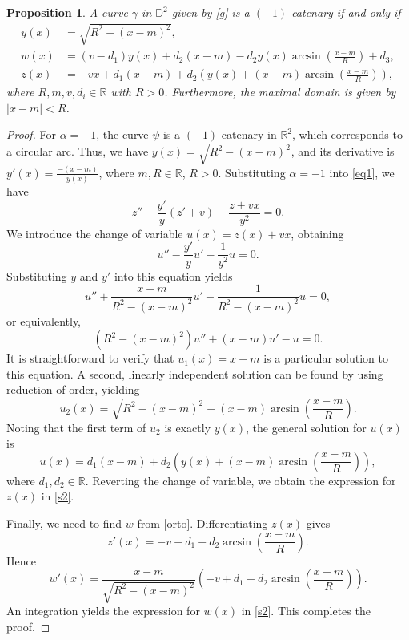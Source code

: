 \documentclass[a4paper,12pt]{amsart}
\newtheorem{proposition}[theorem]{Proposition}
\theoremstyle{definition}
\def\r{\mathbb R}
\def\d{\mathsf d}
\def\d{\mathbb D}
\begin{document}
 
 
\begin{proposition}\label{p25}
A curve $\gamma $ in $\d^2$     given by \eqref{g} is a $(-1)$-catenary if and only if 
\begin{equation}
\begin{split}\label{s2}
y(x)&=\sqrt{R^2-(x-m)^2},\\
w(x)&=(v-d_1) y(x) + d_2 (x-m) - d_2 y(x) \arcsin\left(\frac{x-m}{R}\right) + d_3,\\
z(x)&=-vx + d_1(x-m) + d_2 \left( y(x) + (x-m)\arcsin\left(\frac{x-m}{R}\right) \right),
\end{split}
\end{equation}
where $R, m, v, d_i \in \mathbb{R}$ with $R>0$. Furthermore, the maximal domain is given by $|x-m| < R$.
\end{proposition}

\begin{proof}
For $\alpha=-1$, the   curve $\psi$ is a $(-1)$-catenary in $\r^2$, which corresponds to a circular arc. Thus, we have $y(x) = \sqrt{R^2-(x-m)^2}$, and its derivative is $y'(x) = \frac{-(x-m)}{y(x)}$, where $m,R\in \r$, $R>0$. Substituting $\alpha=-1$ into \eqref{eq1}, we have
$$
z'' - \frac{y'}{y}(z'+v) - \frac{z+vx}{y^2} = 0.
$$
We introduce the change of variable $u(x)=z(x)+vx$, obtaining
$$
u'' - \frac{y'}{y} u' - \frac{1}{y^2} u = 0.
$$
Substituting $y$ and $y'$ into this equation yields
$$
u'' + \frac{x-m}{R^2-(x-m)^2} u' - \frac{1}{R^2-(x-m)^2} u = 0,
$$
or equivalently,
$$
(R^2-(x-m)^2) u'' + (x-m) u' - u = 0.
$$
It is straightforward to verify that $u_1(x) = x-m$ is a particular solution to this equation. A second, linearly independent solution can be found by using reduction of order, yielding 
$$u_2(x) = \sqrt{R^2-(x-m)^2} + (x-m)\arcsin\left(\frac{x-m}{R}\right).$$
 Noting that the first term of $u_2$ is exactly $y(x)$, the general solution for $u(x)$ is
$$
u(x) = d_1 (x-m) + d_2 \left( y(x) + (x-m)\arcsin\left(\frac{x-m}{R}\right) \right),
$$
where $d_1, d_2 \in \mathbb{R}$. Reverting the change of variable, we obtain the expression for $z(x)$ in  \eqref{s2}. 


Finally, we need to find $w$ from \eqref{orto}. Differentiating $z(x)$ gives
$$
z'(x) = -v + d_1 + d_2 \arcsin\left(\frac{x-m}{R}\right).
$$
Hence
$$w'(x) = \frac{x-m}{\sqrt{R^2-(x-m)^2}} \left( -v + d_1 + d_2 \arcsin\left(\frac{x-m}{R}\right) \right).$$
An integration yields the expression for $w(x)$ in \eqref{s2}.   This completes the proof.
\end{proof}
\end{document}
